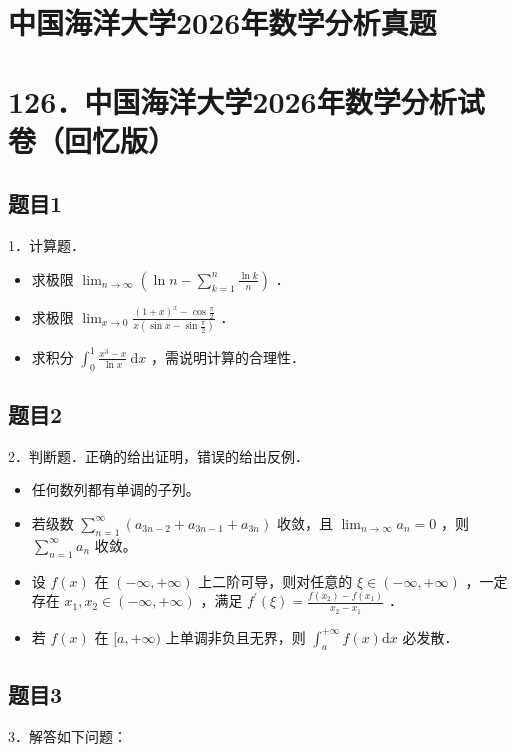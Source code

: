 \documentclass{article}
\begin{document}
\section*{中国海洋大学2026年数学分析真题}
\section*{126．中国海洋大学2026年数学分析试卷（回忆版）}

\subsection{题目1}
1．计算题．

\begin{itemize}
  \item[（1）] 求极限 \(\lim _{n \rightarrow \infty}\left(\ln n-\sum_{k=1}^{n} \frac{\ln k}{n}\right)\) ．
  \item[（2）] 求极限 \(\lim _{x \rightarrow 0} \frac{(1+x)^{x}-\cos \frac{\pi}{2}}{x\left(\sin x-\sin \frac{\pi}{2}\right)}\) ．
  \item[（3）] 求积分 \(\int_{0}^{1} \frac{x^{3}-x}{\ln x} \mathrm{~d} x\) ，需说明计算的合理性．
\end{itemize}

\subsection{题目2}
2．判断题．正确的给出证明，错误的给出反例．

\begin{itemize}
  \item[（1）] 任何数列都有单调的子列。
  \item[（2）] 若级数 \(\sum_{n=1}^{\infty}\left(a_{3 n-2}+a_{3 n-1}+a_{3 n}\right)\) 收敛，且 \(\lim _{n \rightarrow \infty} a_{n}=0\) ，则 \(\sum_{n=1}^{\infty} a_{n}\) 收敛。
  \item[（3）] 设 \(f(x)\) 在 \((-\infty,+\infty)\) 上二阶可导，则对任意的 \(\xi \in(-\infty,+\infty)\) ，一定存在 \(x_{1}, x_{2} \in(-\infty,+\infty)\) ，满足 \(f^{\prime}(\xi)=\frac{f\left(x_{2}\right)-f\left(x_{1}\right)}{x_{2}-x_{1}}\) ．
  \item[（4）] 若 \(f(x)\) 在 \([a,+\infty)\) 上单调非负且无界，则 \(\int_{a}^{+\infty} f(x) \mathrm{d} x\) 必发散．
\end{itemize}

\subsection{题目3}
3．解答如下问题：
\end{document}
